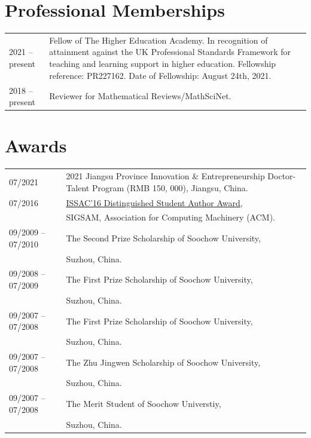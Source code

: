 \documentclass[a4paper,12pt]{article}
\begin{document}
\section*{\Large{Professional Memberships}}
\begin{tabular}{@{}p{1.4in}p{4in}} 
2021 -- present & Fellow of The Higher Education Academy. 
In recognition of attainment against the UK
Professional Standards Framework for teaching and learning support in higher education.
Fellowship reference: PR227162. Date of Fellowship: August 24th, 2021. \\
2018 -- present &  Reviewer for Mathematical Reviews/MathSciNet.            
\end{tabular}


\section*{\Large{Awards}}
\begin{tabular}{@{}p{1.4in}p{4in}}
07/2021         & 2021 Jiangsu Province Innovation \& Entrepreneurship Doctor-Talent Program (RMB 150, 000), 
                       Jiangsu, China. \\
07/2016               & \href{https://www.sigsam.org/Awards/ISSACAwards.html}{ISSAC'16 Distinguished Student Author Award}, \\
                      & SIGSAM, Association for Computing Machinery (ACM). \\
09/2009 -- 07/2010    & The Second Prize Scholarship of Soochow University, \\ 
                      & Suzhou, China.\\
09/2008 -- 07/2009    & The First Prize Scholarship of Soochow University, \\ 
                      & Suzhou, China.\\
09/2007 -- 07/2008    & The First Prize Scholarship of Soochow University, \\ 
                      & Suzhou, China.\\
09/2007 -- 07/2008    & The Zhu Jingwen Scholarship of Soochow University, \\ 
                      & Suzhou, China.\\
09/2007 -- 07/2008    & The Merit Student of Soochow Universtiy, \\ 
                      & Suzhou, China.\\
\end{tabular}
\end{document}
